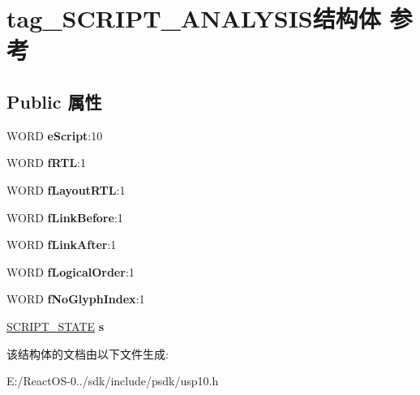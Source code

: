 \hypertarget{structtag___s_c_r_i_p_t___a_n_a_l_y_s_i_s}{}\section{tag\+\_\+\+S\+C\+R\+I\+P\+T\+\_\+\+A\+N\+A\+L\+Y\+S\+I\+S结构体 参考}
\label{structtag___s_c_r_i_p_t___a_n_a_l_y_s_i_s}
\subsection*{Public 属性}
\begin{DoxyCompactItemize}
\item 
\mbox{\label{structtag___s_c_r_i_p_t___a_n_a_l_y_s_i_s_a13bfeb5e0236e069f9e2a33796f950bc}} 
W\+O\+RD {\bfseries e\+Script}\+:10
\item 
\mbox{\label{structtag___s_c_r_i_p_t___a_n_a_l_y_s_i_s_ad5f4a411f6264d93543ec122ad900395}} 
W\+O\+RD {\bfseries f\+R\+TL}\+:1
\item 
\mbox{\label{structtag___s_c_r_i_p_t___a_n_a_l_y_s_i_s_a6fa4275853ccb0ff1fc6be5b9aa74a95}} 
W\+O\+RD {\bfseries f\+Layout\+R\+TL}\+:1
\item 
\mbox{\label{structtag___s_c_r_i_p_t___a_n_a_l_y_s_i_s_a27d1d97d65d5486687f63feba0e18189}} 
W\+O\+RD {\bfseries f\+Link\+Before}\+:1
\item 
\mbox{\label{structtag___s_c_r_i_p_t___a_n_a_l_y_s_i_s_a0e24ac5e8c1bd562881914359bc4df3f}} 
W\+O\+RD {\bfseries f\+Link\+After}\+:1
\item 
\mbox{\label{structtag___s_c_r_i_p_t___a_n_a_l_y_s_i_s_a4c0dbd4741f99653a1bb85e07c221566}} 
W\+O\+RD {\bfseries f\+Logical\+Order}\+:1
\item 
\mbox{\label{structtag___s_c_r_i_p_t___a_n_a_l_y_s_i_s_a87127ba5106a8be1db36135794cbcdfc}} 
W\+O\+RD {\bfseries f\+No\+Glyph\+Index}\+:1
\item 
\mbox{\label{structtag___s_c_r_i_p_t___a_n_a_l_y_s_i_s_a00b9b33518fa7ef94530889308de0a9b}} 
\hyperlink{structtag___s_c_r_i_p_t___s_t_a_t_e}{S\+C\+R\+I\+P\+T\+\_\+\+S\+T\+A\+TE} {\bfseries s}
\end{DoxyCompactItemize}


该结构体的文档由以下文件生成\+:\begin{DoxyCompactItemize}
\item 
E\+:/\+React\+O\+S-\/0../sdk/include/psdk/usp10.\+h\end{DoxyCompactItemize}
